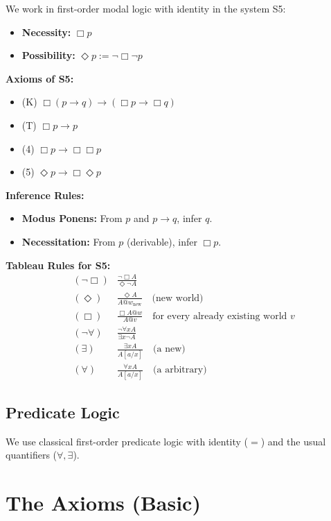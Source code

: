 \documentclass[
]{article}
\begin{document}
We work in first-order modal logic with identity in the system S5:

\begin{itemize}
\item \textbf{Necessity:} \(\Box p\)
\item \textbf{Possibility:} \(\Diamond p := \neg\Box\neg p\)
\end{itemize}

\textbf{Axioms of S5:}
\begin{itemize}
\item (K) \(\Box(p \rightarrow q) \rightarrow (\Box p \rightarrow \Box q)\)
\item (T) \(\Box p \rightarrow p\)
\item (4) \(\Box p \rightarrow \Box\Box p\)
\item (5) \(\Diamond p \rightarrow \Box\Diamond p\)
\end{itemize}

\textbf{Inference Rules:}
\begin{itemize}
\item \textbf{Modus Ponens:} From \(p\) and \(p \rightarrow q\), infer \(q\).
\item \textbf{Necessitation:} From \(p\) (derivable), infer \(\Box p\).
\end{itemize}

\textbf{Tableau Rules for S5:}
\begin{align*}
& (\neg\Box) & \frac{\neg\Box A}{\Diamond\neg A} \\
& (\Diamond) & \frac{\Diamond A}{A @ w_{\text{new}}} \quad \text{(new world)} \\
& (\Box) & \frac{\Box A @ w}{A @ v} \quad \text{for every already existing world } v \\
& (\neg\forall) & \frac{\neg\forall x A}{\exists x \neg A} \\
& (\exists) & \frac{\exists x A}{A[a/x]} \quad \text{(a new)} \\
& (\forall) & \frac{\forall x A}{A[a/x]} \quad \text{(a arbitrary)}
\end{align*}

\subsection{Predicate Logic}

We use classical first-order predicate logic with identity (\(=\)) and the usual quantifiers (\(\forall, \exists\)).

\section{The Axioms (Basic)}
\end{document}
